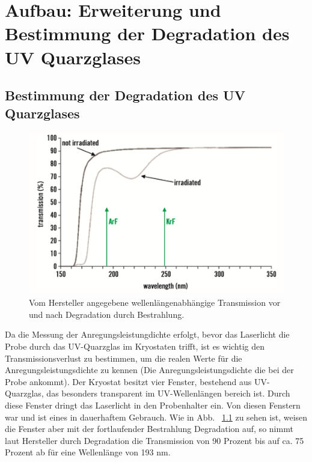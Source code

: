 \chapter{Aufbau: Erweiterung und Bestimmung der Degradation des UV Quarzglases }
\thispagestyle{fancy}

\section{Bestimmung der Degradation des UV Quarzglases}
\begin{figure}[htb]
  \centering
  \begin{minipage}[t]{0.49\linewidth}
      \centering
      \includegraphics[width=\linewidth]{Bilder/uvsilicaDegradation.png}
      \caption{Vom Hersteller angegebene wellenlängenabhängige Transmission vor und nach Degradation durch Bestrahlung.}
      \label{fig:degra}
  \end{minipage}
\end{figure}
%
Da die Messung der Anregungsleistungdichte erfolgt, bevor das Laserlicht die Probe durch das UV-Quarzglas im Kryostaten trifft, ist es wichtig den Transmissionsverlust zu bestimmen, um die realen Werte für die Anregungsleistungsdichte zu kennen (Die Anregungsleistungsdichte die bei der Probe ankommt). Der Kryostat besitzt vier Fenster, bestehend aus UV-Quarzglas, das besonders transparent im UV-Wellenlängen bereich ist. Durch diese Fenster dringt das Laserlicht in den Probenhalter ein. Von diesen Fenstern war und ist eines in dauerhaftem Gebrauch. Wie in Abb. ~\ref{fig:degra} zu sehen ist, weisen die Fenster aber mit der fortlaufender Bestrahlung Degradation auf, so nimmt laut Hersteller durch Degradation die Transmission von 90 Prozent bis auf ca. 75 Prozent ab für eine Wellenlänge von 193 nm.
